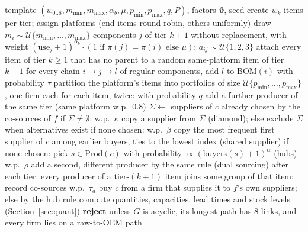 \documentclass{ifacconf}
\begin{document}
\begin{algorithm}[t]
\caption{Product-integrated network generator}
\label{alg:gen}
\small
\begin{algorithmic}[1]
\Require template $(w_{0..8}, m_{\min}, m_{\max}, \alpha_b, \mu, p_{\min}, p_{\max}, q, P)$, factors $\boldsymbol{\vartheta}$, seed
\State create $w_k$ items per tier; assign platforms (end items round-robin, others uniformly)
 
  \State draw $m_i\sim\mathcal{U}\{m_{\min},\dots,m_{\max}\}$ components $j$ of tier $k{+}1$ without replacement, with weight $(\mathrm{use}_j+1)^{\alpha_b}\cdot(1\text{ if }\pi(j)=\pi(i)\text{ else }\mu)$; $a_{ij}\sim\mathcal{U}\{1,2,3\}$
\EndFor
\State attach every item of tier $k\ge1$ that has no parent to a random same-platform item of tier $k{-}1$
\State for every chain $i\to j\to l$ of regular components, add $l$ to $\mathrm{BOM}(i)$ with probability $\tau$ 
 
  \State partition the platform's items into portfolios of size $\mathcal{U}\{p_{\min},\dots,p_{\max}\}$, one firm each
\EndFor
\State for each item, twice: with probability $q$ add a further producer of the same tier (same platform w.p.\ 0.8)
 
  \State $\Sigma\gets$ suppliers of $c$ already chosen by the co-sources of $f$
  \State if $\Sigma\neq\emptyset$: w.p.\ $\kappa$ copy a supplier from $\Sigma$ (diamond); else exclude $\Sigma$ when alternatives exist
  \State if none chosen: w.p.\ $\beta$ copy the most frequent first supplier of $c$ among earlier buyers, ties to the lowest index (shared supplier)
  \State if none chosen: pick $s\in\mathrm{Prod}(c)$ with probability $\propto(\mathrm{buyers}(s)+1)^{\alpha}$ (hubs)
  \State w.p.\ $\rho$ add a second, different producer by the same rule (dual sourcing)
\EndFor
\State after each tier: every producer of a tier-$(k{+}1)$ item joins some group of that item; record co-sources
 
  \State w.p.\ $\tau_d$ buy $c$ from a firm that supplies it to $f$'s own suppliers; else by the hub rule
\EndFor
\State compute quantities, capacities, lead times and stock levels (Section~\ref{sec:quant})
\State \textbf{reject} unless $G$ is acyclic, its longest path has 8 links, and every firm lies on a raw-to-OEM path
\end{algorithmic}
\end{algorithm}
\end{document}
